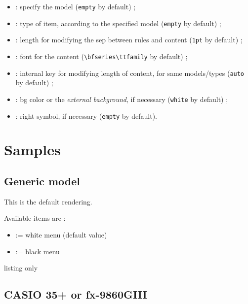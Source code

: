 \documentclass[11pt,a4paper]{ltxdoc}
\begin{document}
\begin{itemize}[leftmargin=*]
	\item {} : specify the model (\texttt{empty} by default) ;
	\item {} : type of item, according to the specified model (\texttt{empty} by default) ;
	\item {} : length for modifying the sep between rules and content (\texttt{1pt} by default) ;
	\item {} : font for the content (\texttt{\textbackslash bfseries\textbackslash ttfamily} by default) ;
	\item {} : internal key for modifying length of content, for same models/types (\texttt{auto} by default) ;
	\item {} : bg color or the \textit{external background}, if necessary (\texttt{white} by default) ;
	\item {} : right symbol, if necessary (\texttt{empty} by default).
\end{itemize}

\section{Samples}

\subsection{Generic model}

This is the default rendering.

Available items are :

\begin{itemize}[leftmargin=*]
	\item \ShowCode{[type=\{\}]} := white menu (default value)\hfill{}
	\item \ShowCode{[type=black]} := black menu\hfill{}
\end{itemize}

\begin{DemoCode}{listing only}%
\end{DemoCode}

\subsection{CASIO 35+ or fx-9860GIII}
\end{document}
